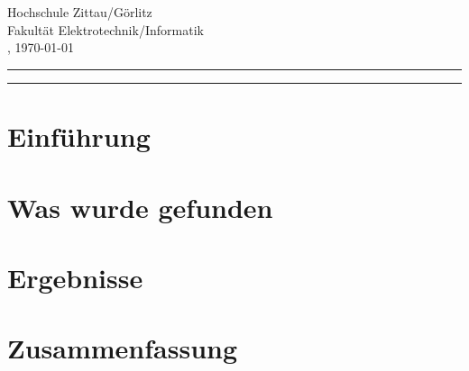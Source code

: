 \documentclass[../main.tex]{subfiles}
\begin{document}
\begin{center}
    \Huge
    \textbf{\paperTitle}\\
    \vspace{0.5cm}
    \large
    \authorName\\
    \vspace{0.5cm}
    \footnotesize
    Hochschule Zittau/Görlitz\\
    Fakultät Elektrotechnik/Informatik\\
    \place, \today
    \vspace{1cm}
    
\end{center}

\normalsize
\hrule
    \vspace{0.25cm}
    \begin{abstract}
        
    \end{abstract}
    \vspace{0.5cm}
\hrule

\begin{multicols}{2}[]
\section{Einführung}
\lipsum
\section{Was wurde gefunden}
\lipsum
\section{Ergebnisse}
\lipsum
\section{Zusammenfassung}
\lipsum
\end{multicols}
\end{document}
